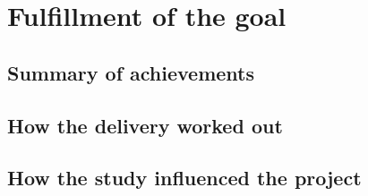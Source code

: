 \section{Fulfillment of the goal}
\subsection{Summary of achievements}
\subsection{How the delivery worked out}
\subsection{How the study influenced the project}